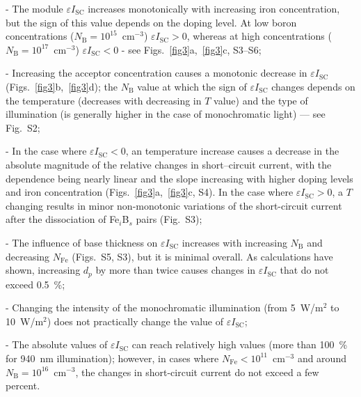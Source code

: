 \documentclass[a4paper,fleqn]{cas-sc}
\begin{document}
\noindent
- The module $\varepsilon I_\mathrm{SC}$ increases monotonically with increasing iron concentration,
    but the sign of this value depends on the doping level.
    At low boron concentrations ($N_\mathrm{B}=10^{15}$~cm$^{-3}$) $\varepsilon I_\mathrm{SC} > 0$,
    whereas at high concentrations ($N_\mathrm{B}=10^{17}$~cm$^{-3}$) $\varepsilon I_\mathrm{SC} < 0$ - see Figs.~\ref{fig3}a,~\ref{fig3}c, S3--S6;

\noindent
- Increasing the acceptor concentration causes a monotonic decrease in $\varepsilon I_\mathrm{SC}$ (Figs.~\ref{fig3}b,~\ref{fig3}d);
    the $N_\mathrm{B}$ value at which the sign of $\varepsilon I_\mathrm{SC}$ changes depends on the temperature
    (decreases with decreasing in $T$ value) and the type of illumination (is generally higher in the case of monochromatic light) --- see Fig.~S2;

\noindent
 - In the case where $\varepsilon I_\mathrm{SC} < 0$, an temperature increase causes a decrease in the absolute magnitude
    of the relative changes in short--circuit current, with the dependence being nearly linear and
    the slope increasing with higher doping levels and iron concentration (Figs.~\ref{fig3}a,~\ref{fig3}c, S4).
    In the case where $\varepsilon I_\mathrm{SC} > 0$,
    a $T$ changing results in minor non-monotonic variations of the short-circuit current after the dissociation of Fe$_i$B$_s$  pairs (Fig.~S3);

\noindent
- The influence of base thickness on $\varepsilon I_\mathrm{SC}$ increases with
    increasing $N_\mathrm{B}$ and decreasing $N_\mathrm{Fe}$ (Figs.~S5, S3), but it is minimal overall.
    As calculations have shown, increasing $d_p$ by more than twice causes changes in $\varepsilon I_\mathrm{SC}$ that do not exceed 0.5~\%;

\noindent
- Changing the intensity of the monochromatic illumination (from 5~W/m$^{2}$ to 10~W/m$^{2}$) does not practically change the value of $\varepsilon I_\mathrm{SC}$;


\noindent
- The absolute values of $\varepsilon I_\mathrm{SC}$ can reach relatively high values (more than 100~\% for 940~nm illumination);
    however, in cases where $N_\mathrm{Fe}<10^{11}$~cm$^{-3}$ and around $N_\mathrm{B}=10^{16}$~cm$^{-3}$, the changes in short-circuit current do not exceed a few percent.
\end{document}
